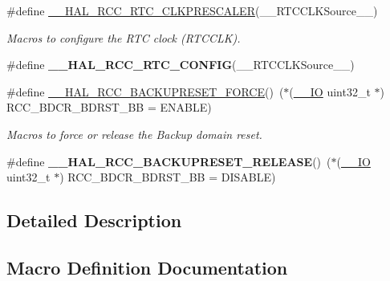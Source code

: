 \begin{DoxyCompactItemize}
\item 
\#define \hyperlink{group___r_c_c___internal___r_t_c___clock___configuration_ga7e10e306e7d9f3cd59d30dcb2c9cf61d}{\+\_\+\+\_\+\+H\+A\+L\+\_\+\+R\+C\+C\+\_\+\+R\+T\+C\+\_\+\+C\+L\+K\+P\+R\+E\+S\+C\+A\+L\+ER}(\+\_\+\+\_\+\+R\+T\+C\+C\+L\+K\+Source\+\_\+\+\_\+)
\begin{DoxyCompactList}\small\item\em Macros to configure the R\+TC clock (R\+T\+C\+C\+LK). \end{DoxyCompactList}\item 
\#define {\bfseries \+\_\+\+\_\+\+H\+A\+L\+\_\+\+R\+C\+C\+\_\+\+R\+T\+C\+\_\+\+C\+O\+N\+F\+IG}(\+\_\+\+\_\+\+R\+T\+C\+C\+L\+K\+Source\+\_\+\+\_\+)
\item 
\#define \hyperlink{group___r_c_c___internal___r_t_c___clock___configuration_ga3bf7da608ff985873ca8e248fb1dc4f0}{\+\_\+\+\_\+\+H\+A\+L\+\_\+\+R\+C\+C\+\_\+\+B\+A\+C\+K\+U\+P\+R\+E\+S\+E\+T\+\_\+\+F\+O\+R\+CE}()~($\ast$(\hyperlink{core__sc300_8h_aec43007d9998a0a0e01faede4133d6be}{\+\_\+\+\_\+\+IO} uint32\+\_\+t $\ast$) R\+C\+C\+\_\+\+B\+D\+C\+R\+\_\+\+B\+D\+R\+S\+T\+\_\+\+BB = E\+N\+A\+B\+LE)
\begin{DoxyCompactList}\small\item\em Macros to force or release the Backup domain reset. \end{DoxyCompactList}\item 
\#define {\bfseries \+\_\+\+\_\+\+H\+A\+L\+\_\+\+R\+C\+C\+\_\+\+B\+A\+C\+K\+U\+P\+R\+E\+S\+E\+T\+\_\+\+R\+E\+L\+E\+A\+SE}()~($\ast$(\hyperlink{core__sc300_8h_aec43007d9998a0a0e01faede4133d6be}{\+\_\+\+\_\+\+IO} uint32\+\_\+t $\ast$) R\+C\+C\+\_\+\+B\+D\+C\+R\+\_\+\+B\+D\+R\+S\+T\+\_\+\+BB = D\+I\+S\+A\+B\+LE)\hypertarget{group___r_c_c___internal___r_t_c___clock___configuration_ga14f32622c65f4ae239ba8cb00d510321}{}\label{group___r_c_c___internal___r_t_c___clock___configuration_ga14f32622c65f4ae239ba8cb00d510321}

\end{DoxyCompactItemize}


\subsection{Detailed Description}


\subsection{Macro Definition Documentation}
